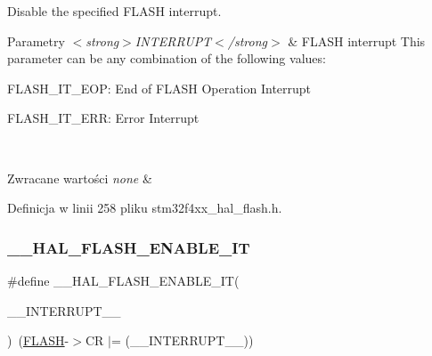 Disable the specified F\+L\+A\+SH interrupt. 


\begin{DoxyParams}{Parametry}
{\em $<$strong$>$\+I\+N\+T\+E\+R\+R\+U\+P\+T$<$/strong$>$} & F\+L\+A\+SH interrupt This parameter can be any combination of the following values\+: \begin{DoxyItemize}
\item F\+L\+A\+S\+H\+\_\+\+I\+T\+\_\+\+E\+OP\+: End of F\+L\+A\+SH Operation Interrupt \item F\+L\+A\+S\+H\+\_\+\+I\+T\+\_\+\+E\+RR\+: Error Interrupt \end{DoxyItemize}
\\
\hline
\end{DoxyParams}

\begin{DoxyRetVals}{Zwracane wartości}
{\em none} & \\
\hline
\end{DoxyRetVals}


Definicja w linii 258 pliku stm32f4xx\+\_\+hal\+\_\+flash.\+h.

\mbox{\label{group___f_l_a_s_h___exported___macros_ga13fa137a911f02a2f94fb9fb0762a340}} 
\subsubsection{\texorpdfstring{\+\_\+\+\_\+\+H\+A\+L\+\_\+\+F\+L\+A\+S\+H\+\_\+\+E\+N\+A\+B\+L\+E\+\_\+\+IT}{\_\_HAL\_FLASH\_ENABLE\_IT}}
{\footnotesize\ttfamily \#define \+\_\+\+\_\+\+H\+A\+L\+\_\+\+F\+L\+A\+S\+H\+\_\+\+E\+N\+A\+B\+L\+E\+\_\+\+IT(\begin{DoxyParamCaption}\item[{}]{\+\_\+\+\_\+\+I\+N\+T\+E\+R\+R\+U\+P\+T\+\_\+\+\_\+ }\end{DoxyParamCaption})~(\hyperlink{group___peripheral__declaration_ga844ea28ba1e0a5a0e497f16b61ea306b}{F\+L\+A\+SH}-\/$>$CR $\vert$= (\+\_\+\+\_\+\+I\+N\+T\+E\+R\+R\+U\+P\+T\+\_\+\+\_\+))}



